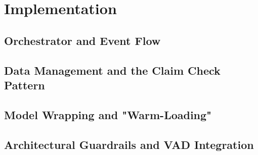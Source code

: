 \chapter{Implementation}
\label{chap:implementation}


\section{Orchestrator and Event Flow}
\label{sec:impl_orchestrator}


\section{Data Management and the Claim Check Pattern}
\label{sec:impl_data_management}


\section{Model Wrapping and "Warm-Loading"}
\label{sec:impl_model_wrapping}

\section{Architectural Guardrails and VAD Integration}
\label{sec:impl_guardrails}
